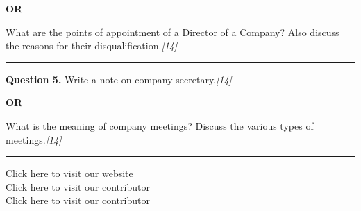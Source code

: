 \documentclass[11pt,a4paper]{article}
\newcommand{\pts}[1]{\hfill   \textit{[#1]}}
\begin{document}
\centerline{   \textbf{OR}}

What are the points of appointment of a Director of a Company? Also discuss the reasons for their disqualification.\pts{14}

\medskip\rule{\linewidth}{0.2pt}




\noindent   \textbf{Question 5.}
Write a note on company secretary.\pts{14}

\centerline{   \textbf{OR}}

What is the meaning of company meetings? Discuss the various types of meetings.\pts{14}

\vfill
\rule{\linewidth}{0.4pt}

\begin{center}\small
\href{https://bhu-exam.vercel.app/}{Click here to visit our website}\\[4pt]
\href{https://me-aryan.vercel.app/}{Click here to visit our contributor}\\[4pt]
\href{https://quashan-me.vercel.app/}{Click here to visit our contributor}
\end{center}
\end{document}
